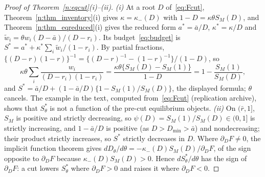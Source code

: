 \documentclass[11pt,letterpaper]{article}
\theoremstyle{definition}
\begin{document}
\begin{proof}[Proof of Theorem~\ref{n:eqcut}(i)--(ii)]
\emph{(i)} At a root $D$ of~\eqref{eq:Fcut}, Theorem~\ref{n:thm_inventory}(i) gives $\kappa = \kappa_-(D)$ with $1 - D = \kappa\theta S_M(D)$, and Theorem~\ref{n:thm_eqreduced}(i) gives the reduced form $a^* = \bar a/D$, $\kappa^* = \kappa/D$ and $\tilde w_i = \theta w_i (D - \bar a)/(D - r_i)$. Its budget~\eqref{eq:budget} is $S^* = a^* + \kappa^* \sum_i \tilde w_i/(1 - r_i)$. By partial fractions, $\{(D - r)(1 - r)\}^{-1} = \{(D - r)^{-1} - (1 - r)^{-1}\}/(1 - D)$, so
\[
  \kappa\theta \sum_i \frac{w_i}{(D - r_i)(1 - r_i)} = \frac{\kappa\theta\{S_M(D) - S_M(1)\}}{1 - D} = 1 - \frac{S_M(1)}{S_M(D)},
\]
and $S^* = \bar a/D + (1 - \bar a/D)\{1 - S_M(1)/S_M(D)\}$, the displayed formula; $\theta$ cancels. The example in the text, computed from~\eqref{eq:Fcut} (replication archive), shows that $S^*_\theta$ is not a function of the pre-cut equilibrium objects. \emph{(ii)} On $(\bar r, 1]$, $S_M$ is positive and strictly decreasing, so $\psi(D) = S_M(1)/S_M(D) \in (0, 1]$ is strictly increasing, and $1 - \bar a/D$ is positive (as $D > D_{\min} > \bar a$) and nondecreasing; their product strictly increases, so $S^*$ strictly decreases in $D$. Where $\partial_D F \ne 0$, the implicit function theorem gives $dD_\theta/d\theta = -\kappa_-(D)S_M(D)/\partial_D F$, of the sign opposite to $\partial_D F$ because $\kappa_-(D)S_M(D) > 0$. Hence $dS^*_\theta/d\theta$ has the sign of $\partial_D F$: a cut lowers $S^*_\theta$ where $\partial_D F > 0$ and raises it where $\partial_D F < 0$.
\end{proof}
\end{document}
